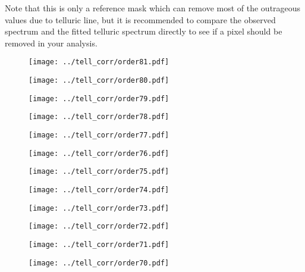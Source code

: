 \documentclass{article}
\begin{document}
Note that this is only a reference mask which can remove most of the outrageous values due to telluric line, but it is recommended to compare the observed spectrum and the fitted telluric spectrum directly to see if a pixel should be removed in your analysis.

\begin{figure}[H]
    \centering
    \texttt{[image: ../tell\_corr/order81.pdf]}
\end{figure}
\begin{figure}[H]
    \centering
    \texttt{[image: ../tell\_corr/order80.pdf]}
\end{figure}
\begin{figure}[H]
    \centering
    \texttt{[image: ../tell\_corr/order79.pdf]}
\end{figure}
\begin{figure}[H]
    \centering
    \texttt{[image: ../tell\_corr/order78.pdf]}
\end{figure}
\begin{figure}[H]
    \centering
    \texttt{[image: ../tell\_corr/order77.pdf]}
\end{figure}
\begin{figure}[H]
    \centering
    \texttt{[image: ../tell\_corr/order76.pdf]}
\end{figure}
\begin{figure}[H]
    \centering
    \texttt{[image: ../tell\_corr/order75.pdf]}
\end{figure}
\begin{figure}[H]
    \centering
    \texttt{[image: ../tell\_corr/order74.pdf]}
\end{figure}
\begin{figure}[H]
    \centering
    \texttt{[image: ../tell\_corr/order73.pdf]}
\end{figure}
\begin{figure}[H]
    \centering
    \texttt{[image: ../tell\_corr/order72.pdf]}
\end{figure}
\begin{figure}[H]
    \centering
    \texttt{[image: ../tell\_corr/order71.pdf]}
\end{figure}
\begin{figure}[H]
    \centering
    \texttt{[image: ../tell\_corr/order70.pdf]}
\end{figure}
\end{document}
